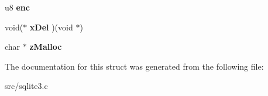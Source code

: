 \begin{DoxyCompactItemize}
\item 
\hypertarget{struct_mem_af437c99e92b8e729b70f82fa94e96bff}{u8 {\bfseries enc}}\label{struct_mem_af437c99e92b8e729b70f82fa94e96bff}

\item 
\hypertarget{struct_mem_a081ea2f86933d68a8940785b62f638ef}{void($\ast$ {\bfseries x\-Del} )(void $\ast$)}\label{struct_mem_a081ea2f86933d68a8940785b62f638ef}

\item 
\hypertarget{struct_mem_a68cd8f196d9dc8ab27845e1b4abbc95c}{char $\ast$ {\bfseries z\-Malloc}}\label{struct_mem_a68cd8f196d9dc8ab27845e1b4abbc95c}

\end{DoxyCompactItemize}


The documentation for this struct was generated from the following file\-:\begin{DoxyCompactItemize}
\item 
src/sqlite3.\-c\end{DoxyCompactItemize}
